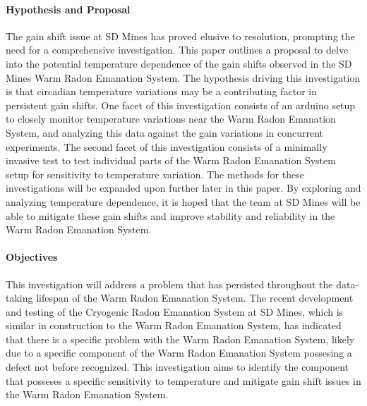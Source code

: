 \documentclass[letterpaper,12pt]{article}
\begin{document}
\paragraph*{Hypothesis and Proposal}
The gain shift issue at SD Mines has proved elusive to resolution, prompting the
need for a comprehensive investigation. 
This paper outlines a proposal to delve into the potential temperature 
dependence of the gain shifts observed in the SD Mines Warm Radon Emanation 
System.
The hypothesis driving this investigation is that circadian temperature
variations may be a contributing factor in persistent gain shifts.
One facet of this investigation consists of an arduino setup to closely monitor 
temperature variations near the Warm Radon Emanation System, and analyzing this
data against the gain variations in concurrent experiments.
The second facet of this investigation consists of a minimally invasive test 
to test individual parts of the Warm Radon Emanation System setup for sensitivity
to temperature variation. 
The methods for these investigations will be expanded upon further later in 
this paper.
By exploring and analyzing temperature dependence, it is hoped that the team at 
SD Mines will be able to mitigate these gain shifts and improve stability and
reliability in the Warm Radon Emanation System.

\paragraph*{Objectives}
This investigation will address a problem that has persisted throughout the 
data-taking lifespan of the Warm Radon Emanation System. 
The recent development and testing of the Cryogenic Radon Emanation System at 
SD Mines, which is similar in construction to the Warm Radon Emanation System,
has indicated that there is a specific problem with the Warm Radon Emanation System, likely due to a 
specific component of the Warm Radon Emanation System possesing a defect not before 
recognized. This investigation aims to identify the component that posseses 
a specific sensitivity to temperature and mitigate gain shift issues in the Warm Radon Emanation System.
\end{document}
